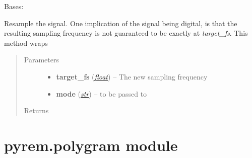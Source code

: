 \documentclass[letterpaper,10pt,english]{sphinxmanual}
\begin{document}

\begin{fulllineitems}
\label{pyrem.time_series:pyrem.time_series.Signal}
Bases: {\hyperref[pyrem.time_series:pyrem.time_series.BiologicalTimeSeries]{}}

\begin{fulllineitems}
\label{pyrem.time_series:pyrem.time_series.Signal.resample}
Resample the signal. One implication of the signal being digital, is that the resulting sampling
frequency is not guaranteed to be exactly at \emph{target\_fs}.
This method wraps 
\begin{quote}\begin{description}
\item[{Parameters}] \leavevmode\begin{itemize}
\item {} 
\textbf{target\_fs} (\href{http://docs.python.org/2.7/library/functions.html\#float}{\emph{float}}) -- The new sampling frequency

\item {} 
\textbf{mode} (\href{http://docs.python.org/2.7/library/functions.html\#str}{\emph{str}}) -- to be passed to \href{http://www.ar.media.kyoto-u.ac.jp/members/david/softwares/samplerate/sphinx/fullapi.html\#scikits.samplerate.resample}{}

\end{itemize}

\item[{Returns}] \leavevmode


\end{description}\end{quote}

\end{fulllineitems}


\end{fulllineitems}



\section{pyrem.polygram module}
\label{pyrem.polygram:module-pyrem.polygram}\label{pyrem.polygram:pyrem-polygram-module}\label{pyrem.polygram::doc}
\end{document}
